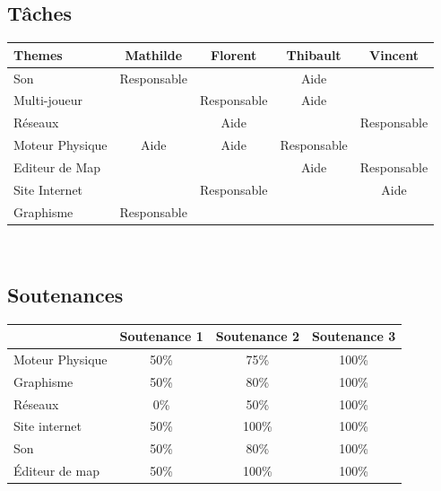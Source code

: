 \documentclass [11pt]{report}
\begin{document}
		\subsection{Tâches}
			\begin{tabular}{| l |*{4} {c|}}
				\hline
				Themes          & Mathilde    & Florent     & Thibault    & Vincent \\
				\hline
				Son             & Responsable &             & Aide        &          \\
				\hline
				Multi-joueur    &             & Responsable & Aide        &          \\
				\hline
				Réseaux         &             & Aide        &             & Responsable     \\
				\hline
				Moteur Physique & Aide        & Aide        & Responsable &           \\
				\hline
				Editeur de Map &              &             & Aide        &  Responsable\\
				\hline
				Site Internet  &              & Responsable &             &  Aide       \\
				\hline
				Graphisme      & Responsable  &             &             &\\
				\hline
				
			\end{tabular}\\\vspace{3mm}


		\subsection{Soutenances}
			\begin{tabular}{| l | * {3}{c|}}
				\hline
		 		& Soutenance 1 & Soutenance 2 & Soutenance 3 \\
				\hline
				Moteur Physique & 50\% & 75\% & 100\% \\
				\hline
				 Graphisme & 50\% & 80\% & 100\% \\
				\hline
				Réseaux & 0\% & 50\% & 100\% \\
				\hline
				Site internet & 50\% & 100\%  & 100\%  \\
	          			 \hline
				Son & 50\% & 80\% & 100\% \\
				\hline
				\'Editeur de map & 50\% & 100\% & 100\% \\
				\hline
			\end{tabular}\\\vspace{4mm}
\end{document}
